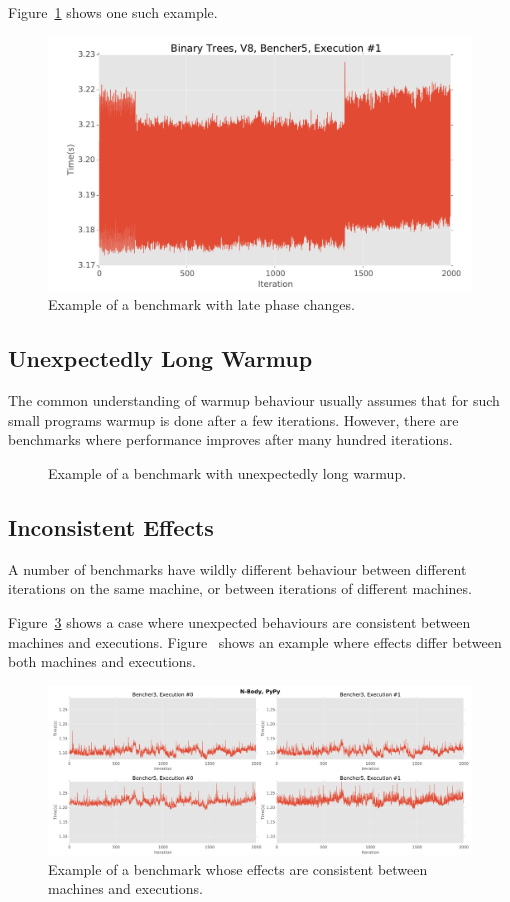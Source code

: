 \documentclass[a4paper,UKenglish]{lipics}
\begin{document}
Figure~\ref{fig:examples:late1} shows one such example.

\begin{figure}[h!]
\centering
\includegraphics[width=.46\textwidth]{examples/late1}
\caption{Example of a benchmark with late phase changes.}
\label{fig:examples:late1}
\end{figure}


\subsection{Unexpectedly Long Warmup}
\label{sub:long}

The common understanding of warmup behaviour usually assumes that for such
small programs warmup is done after a few iterations. However, there are
benchmarks where performance improves after many hundred iterations.

\begin{figure}[h!]
\centering
{}
\caption{Example of a benchmark with unexpectedly long warmup.}
\label{fig:examples:long}
\end{figure}

\subsection{Inconsistent Effects}
\label{sub:inconsistent}

A number of benchmarks have wildly different behaviour between different
iterations on the same machine, or between iterations of different machines.

Figure~\ref{fig:examples:consistent_weirdness1} shows a case where
unexpected behaviours are consistent between machines and executions.
Figure~\label{fig:examples:inconsistent_weirdness1} shows an example where
effects differ between both machines and executions.

\begin{figure}[h!]
\centering
\includegraphics[width=\textwidth]{examples/consistent_weirdness1}
\caption{Example of a benchmark whose effects are consistent between machines and executions.}
\label{fig:examples:consistent_weirdness1}
\end{figure}
\end{document}
